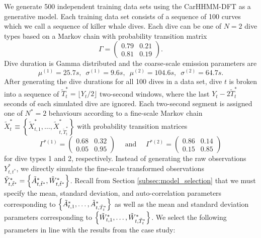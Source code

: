 We generate 500 independent training data sets using the CarHHMM-DFT as a generative model. Each training data set consists of a sequence of 100 curves which we call a sequence of killer whale dives. Each dive can be one of $N=2$ dive types based on a Markov chain with probability transition matrix
%
$$\Gamma = \begin{pmatrix} 0.79 & 0.21 \\ 0.81 & 0.19 \end{pmatrix}.$$
%
Dive duration is Gamma distributed and the coarse-scale emission parameters are 
%
\[\mu^{(1)} = 25.7s, \enspace \sigma^{(1)} = 9.6s, \enspace \mu^{(2)} = 104.6s, \enspace \sigma^{(2)} = 64.7s.\]
%
After generating the dive durations for all 100 dives in a data set, dive $t$ is broken into a sequence of $\tilde T^*_t = \lfloor Y_t/2 \rfloor$ two-second windows, where the last $Y_t - 2 \tilde T^*_t$ seconds of each simulated dive are ignored. Each two-second segment is assigned one of $N^*=2$ behaviours according to a fine-scale Markov chain $\tilde X^*_t \equiv \left\{\tilde X^*_{t,1}, \ldots, \tilde X^*_{t,\tilde T^*_t} \right\}$ with probability transition matrices
%
\[\Gamma^{*(1)} = \begin{pmatrix} 0.68 & 0.32 \\ 0.05 & 0.95 \end{pmatrix} \quad \text{ and } \quad \Gamma^{*(2)} = \begin{pmatrix} 0.86 & 0.14 \\ 0.15 & 0.85 \end{pmatrix}\]
%
for dive types 1 and 2, respectively.
Instead of generating the raw observations $Y^*_{t,t^*}$, we directly simulate the fine-scale transformed observations $\tilde{Y}^*_{t,\tilde t^*} = \left\{\tilde{A}^*_{t,\tilde t^*}, \tilde{W}^*_{t,\tilde t^*}\right\}$. Recall from Section \ref{subsec:model_selection} that we must specify the mean, standard deviation, and auto-correlation parameters corresponding to $\left\{\tilde{A}^*_{t,1},\ldots,\tilde{A}^*_{t,\tilde T_t^*}\right\}$ as well as the mean and standard deviation parameters corresponding to $\left\{\tilde{W}^*_{t,1},\ldots,\tilde{W}^*_{t,\tilde T_t^*}\right\}$. We select the following parameters in line with the results from the case study:
